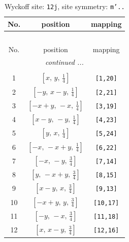 \documentclass[fleqn,8pt]{jsarticle}
\begin{document}
\begin{longtable}{ccc}
\caption{Wyckoff site: {\tt 12j}, site symmetry: {\tt m'..}}
 \\
 \hline \hline
No. & position & mapping \\ \hline \endfirsthead

\multicolumn{2}{l}{\tablename\ \thetable{}} \\
 \hline \hline
No. & position & mapping \\ \hline \endhead

 \hline \hline
\multicolumn{2}{r}{\footnotesize\it continued ...} \\ \endfoot

 \hline \hline
\multicolumn{2}{r}{} \\ \endlastfoot

1 & $\left[ x,\, y,\, \frac{1}{4} \right]$ & {\tt [1,20]} \\ \hline
2 & $\left[ - y,\, x - y,\, \frac{1}{4} \right]$ & {\tt [2,21]} \\ \hline
3 & $\left[ - x + y,\, - x,\, \frac{1}{4} \right]$ & {\tt [3,19]} \\ \hline
4 & $\left[ x - y,\, - y,\, \frac{1}{4} \right]$ & {\tt [4,23]} \\ \hline
5 & $\left[ y,\, x,\, \frac{1}{4} \right]$ & {\tt [5,24]} \\ \hline
6 & $\left[ - x,\, - x + y,\, \frac{1}{4} \right]$ & {\tt [6,22]} \\ \hline
7 & $\left[ - x,\, - y,\, \frac{3}{4} \right]$ & {\tt [7,14]} \\ \hline
8 & $\left[ y,\, - x + y,\, \frac{3}{4} \right]$ & {\tt [8,15]} \\ \hline
9 & $\left[ x - y,\, x,\, \frac{3}{4} \right]$ & {\tt [9,13]} \\ \hline
10 & $\left[ - x + y,\, y,\, \frac{3}{4} \right]$ & {\tt [10,17]} \\ \hline
11 & $\left[ - y,\, - x,\, \frac{3}{4} \right]$ & {\tt [11,18]} \\ \hline
12 & $\left[ x,\, x - y,\, \frac{3}{4} \right]$ & {\tt [12,16]} \\
\end{longtable}
\renewcommand{\arraystretch}{1.2}
\end{document}
